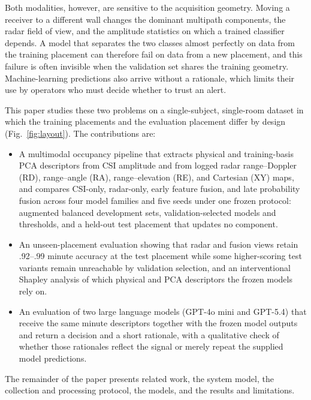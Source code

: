 \documentclass[conference,10pt,letterpaper]{IEEEtran}
\begin{document}
Both modalities, however, are sensitive to the acquisition geometry. Moving a receiver to a different wall changes the dominant multipath components, the radar field of view, and the amplitude statistics on which a trained classifier depends. A model that separates the two classes almost perfectly on data from the training placement can therefore fail on data from a new placement, and this failure is often invisible when the validation set shares the training geometry. Machine-learning predictions also arrive without a rationale, which limits their use by operators who must decide whether to trust an alert.

This paper studies these two problems on a single-subject, single-room dataset in which the training placements and the evaluation placement differ by design (Fig.~\ref{fig:layout}). The contributions are:
\begin{itemize}
\item A multimodal occupancy pipeline that extracts physical and training-basis PCA descriptors from CSI amplitude and from logged radar range--Doppler (RD), range--angle (RA), range--elevation (RE), and Cartesian (XY) maps, and compares CSI-only, radar-only, early feature fusion, and late probability fusion across four model families and five seeds under one frozen protocol: augmented balanced development sets, validation-selected models and thresholds, and a held-out test placement that updates no component.
\item An unseen-placement evaluation showing that radar and fusion views retain .92--.99 minute accuracy at the test placement while some higher-scoring test variants remain unreachable by validation selection, and an interventional Shapley analysis of which physical and PCA descriptors the frozen models rely on.
\item An evaluation of two large language models (GPT-4o mini and GPT-5.4) that receive the same minute descriptors together with the frozen model outputs and return a decision and a short rationale, with a qualitative check of whether those rationales reflect the signal or merely repeat the supplied model predictions.
\end{itemize}
The remainder of the paper presents related work, the system model, the collection and processing protocol, the models, and the results and limitations.
\end{document}
